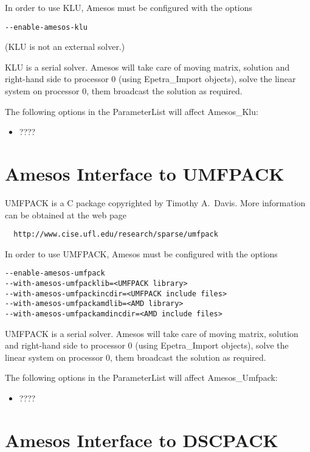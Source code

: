 \documentclass[11pt,letter]{article}
\begin{document}
\smallskip

In order to use KLU, Amesos must be configured with the options
\begin{verbatim}
--enable-amesos-klu
\end{verbatim}
(KLU is not an external solver.)

KLU is a serial solver. Amesos will take care of moving matrix,
solution and right-hand side to processor 0 (using Epetra\_Import
objects), solve the linear system on processor 0, them broadcast the
solution as required.

The following options in the ParameterList will affect Amesos\_Klu:
\begin{itemize}
\item ????
\end{itemize}


\section{Amesos Interface to UMFPACK}
\label{sec:umfpack}

UMFPACK is a C package copyrighted by Timothy A.~Davis. More information
can be obtained at the web page
\begin{verbatim}
  http://www.cise.ufl.edu/research/sparse/umfpack
\end{verbatim}

In order to use UMFPACK, Amesos must be configured with the options
\begin{verbatim}
--enable-amesos-umfpack 
--with-amesos-umfpacklib=<UMFPACK library> 
--with-amesos-umfpackincdir=<UMFPACK include files>
--with-amesos-umfpackamdlib=<AMD library>
--with-amesos-umfpackamdincdir=<AMD include files>
\end{verbatim}

UMFPACK is a serial solver. Amesos will take care of moving matrix,
solution and right-hand side to processor 0 (using Epetra\_Import
objects), solve the linear system on processor 0, them broadcast the
solution as required.

The following options in the ParameterList will affect Amesos\_Umfpack:
\begin{itemize}
\item ????
\end{itemize}


\section{Amesos Interface to DSCPACK}
\label{sec:dscpack}
\end{document}
